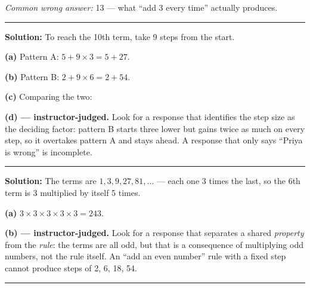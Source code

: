 \documentclass[12pt]{article}
\begin{document}
\emph{Common wrong answer:} 13 --- what ``add 3 every time'' actually produces.

\vspace{0.2cm}\noindent\rule{\linewidth}{0.2pt}\vspace{0.2cm}


\textbf{Solution:} To reach the 10th term, take 9 steps from the start.

\textbf{(a)} Pattern A: $5 + 9 \times 3 = 5 + 27$. 

\textbf{(b)} Pattern B: $2 + 9 \times 6 = 2 + 54$. 

\textbf{(c)} Comparing the two: 

\textbf{(d) --- instructor-judged.} Look for a response that identifies the step size as the deciding factor: pattern B starts three lower but gains twice as much on every step, so it overtakes pattern A and stays ahead. A response that only says ``Priya is wrong'' is incomplete.

\vspace{0.2cm}\noindent\rule{\linewidth}{0.2pt}\vspace{0.2cm}


\textbf{Solution:} The terms are $1, 3, 9, 27, 81, \ldots$ --- each one 3 times the last, so the 6th term is 3 multiplied by itself 5 times.

\textbf{(a)} $3 \times 3 \times 3 \times 3 \times 3 = 243$. 

\textbf{(b) --- instructor-judged.} Look for a response that separates a shared \emph{property} from the \emph{rule}: the terms are all odd, but that is a consequence of multiplying odd numbers, not the rule itself. An ``add an even number'' rule with a fixed step cannot produce steps of 2, 6, 18, 54.

\vspace{0.2cm}\noindent\rule{\linewidth}{0.2pt}\vspace{0.2cm}
\end{document}
